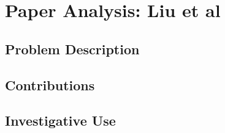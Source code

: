 \section{Paper Analysis: Liu et al }
\subsection{Problem Description}
\subsection{Contributions}
\subsection{Investigative Use}
